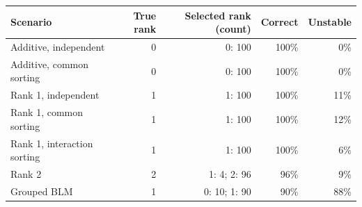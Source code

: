 \begin{tabular}{lrrrr}
\toprule
Scenario & True rank & Selected rank (count) & Correct & Unstable \\
\midrule
Additive, independent & 0 & 0: 100 & 100\% & 0\% \\
Additive, common sorting & 0 & 0: 100 & 100\% & 0\% \\
Rank 1, independent & 1 & 1: 100 & 100\% & 11\% \\
Rank 1, common sorting & 1 & 1: 100 & 100\% & 12\% \\
Rank 1, interaction sorting & 1 & 1: 100 & 100\% & 6\% \\
Rank 2 & 2 & 1: 4; 2: 96 & 96\% & 9\% \\
Grouped BLM & 1 & 0: 10; 1: 90 & 90\% & 88\% \\
\bottomrule
\end{tabular}

